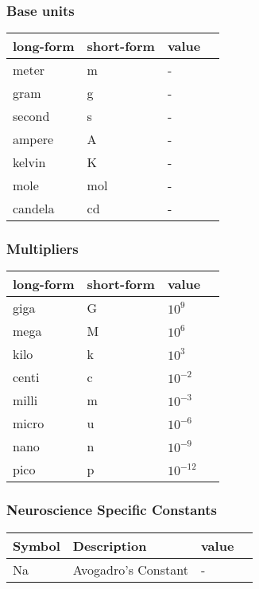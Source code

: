 \documentclass{article}
\begin{document}
\subsubsection{Base units}

\begin{center}
    \begin{tabular}{ | l | l |  l | p{5cm} |}
    \hline
    long-form & short-form & value  \\ \hline
    meter & m & - \\ \hline
    gram & g & - \\ \hline
    second & s & - \\ \hline
    ampere & A & - \\ \hline
    kelvin & K & - \\ \hline
    mole & mol & - \\ \hline
    candela & cd & - \\ \hline
    \end{tabular}
\end{center}

\subsubsection{Multipliers}

\begin{center}
    \begin{tabular}{ | l | l |  l | p{5cm} |}
    \hline
    long-form & short-form & value  \\ \hline
    giga & G & $10^9$ \\ \hline
    mega & M & $10^6$ \\ \hline
    kilo & k & $10^3$ \\ \hline
    centi & c & $10^{-2}$ \\ \hline
    milli & m & $10^{-3}$ \\ \hline
    micro & u & $10^{-6}$ \\ \hline
    nano & n & $10^{-9}$ \\ \hline
    pico & p & $10^{-12}$ \\ \hline
    \end{tabular}
\end{center}




\subsubsection{Neuroscience Specific Constants}
\begin{center}
    \begin{tabular}{ | l | l |  l | p{5cm} |}
    \hline
    Symbol & Description & value  \\ \hline
    Na & Avogadro's Constant & - \\ \hline
    \end{tabular}
\end{center}
\end{document}
